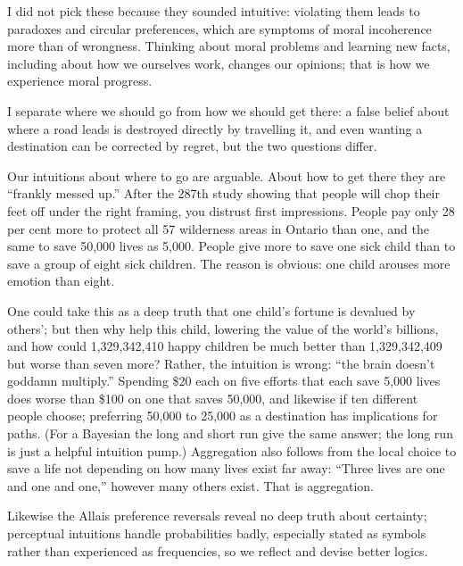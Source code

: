 I did not pick these because they sounded intuitive: violating them leads to paradoxes and circular preferences, which are symptoms of moral incoherence more than of wrongness. Thinking about moral problems and learning new facts, including about how we ourselves work, changes our opinions; that is how we experience moral progress.

I separate where we should go from how we should get there: a false belief about where a road leads is destroyed directly by travelling it, and even wanting a destination can be corrected by regret, but the two questions differ.

Our intuitions about where to go are arguable. About how to get there they are ``frankly messed up.'' After the 287th study showing that people will chop their feet off under the right framing, you distrust first impressions. People pay only 28 per cent more to protect all 57 wilderness areas in Ontario than one, and the same to save 50,000 lives as 5,000. People give more to save one sick child than to save a group of eight sick children. The reason is obvious: one child arouses more emotion than eight. 

One could take this as a deep truth that one child's fortune is devalued by others'; but then why help this child, lowering the value of the world's billions, and how could 1,329,342,410 happy children be much better than 1,329,342,409 but worse than seven more? Rather, the intuition is wrong: ``the brain doesn't goddamn multiply.'' Spending \$20 each on five efforts that each save 5,000 lives does worse than \$100 on one that saves 50,000, and likewise if ten different people choose; preferring 50,000 to 25,000 as a destination has implications for paths. (For a Bayesian the long and short run give the same answer; the long run is just a helpful intuition pump.) Aggregation also follows from the local choice to save a life not depending on how many lives exist far away: ``Three lives are one and one and one,'' however many others exist. That is aggregation.

Likewise the Allais preference reversals reveal no deep truth about certainty; perceptual intuitions handle probabilities badly, especially stated as symbols rather than experienced as frequencies, so we reflect and devise better logics. 

